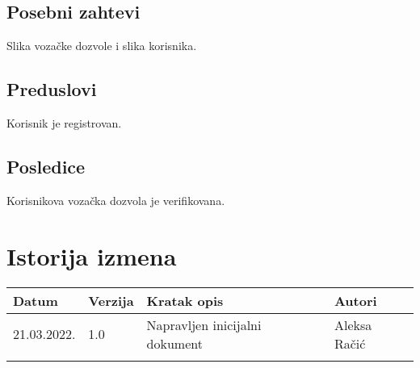 \documentclass[12pt]{article}
\begin{document}
\subsection{Posebni zahtevi}
Slika vozačke dozvole i slika korisnika.
\subsection{Preduslovi}
Korisnik je registrovan.
\subsection{Posledice}
Korisnikova vozačka dozvola je verifikovana.
\section{Istorija izmena}
\begin{center}
\begin{tabular}{ | m{2cm} | m{1.5cm}| m{6cm} | m{5cm} | } 
\hline
Datum & Verzija & Kratak opis & Autori \\ 
\hline
 21.03.2022. & 1.0 & Napravljen inicijalni dokument & Aleksa Račić\\ 
\hline
&&&\\ 
\hline
\end{tabular}
\end{center}
\end{document}

